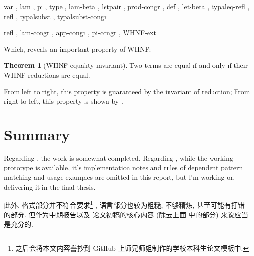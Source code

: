 \documentclass[a4paper, 11pt]{article}
\theoremstyle{remark}\newtheorem*{remark}{Remark}
\theoremstyle{definition}\newtheorem*{definition}{Definition}
\newtheorem{theorem}{Theorem}
\begin{document}
{ var
, lam
, pi
, type
, lam-beta
, letpair
, prod-congr
, def
, let-beta
, typaleq-refl
, refl
, typalsubst
, typalsubst-congr}

{ refl
, lam-congr
, app-congr
, pi-congr
, WHNF-ext}

Which, reveals an important property of WHNF:

\begin{theorem}[WHNF equality invariant]
Two terms are equal if and only if their WHNF reductions are equal.

From left to right, this property is guaranteed by the invariant of reduction;
From right to left, this property is shown by .
\end{theorem}

\section{Summary}
Regarding \Tigris, the work is somewhat completed.
Regarding \Tigrisd, while the working prototype is available,
it's implementation notes and rules of dependent pattern matching and usage examples
are omitted in this report, but I'm working on delivering it in the final thesis.

此外, 格式部分并不符合要求\footnote{
之后会将本文内容誊抄到 GitHub 上师兄师姐制作的学校本科生论文模板中.
}
, 语言部分也较为粗糙, 不够精炼, 甚至可能有打错的部分. 但作为中期报告以及
论文初稿的核心内容 (除去上面 \Tigrisd 中的部分) 来说应当是充分的.

%
\end{document}
